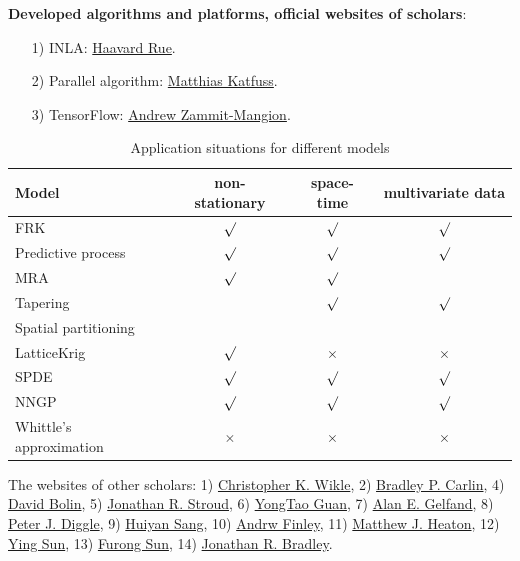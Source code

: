 \documentclass[
12pt, %
a4paper, %
oneside, %
headinclude,footinclude, %
BCOR5mm, %
]{scrartcl}
\begin{document}
\textbf{Developed algorithms and platforms, official websites of scholars}:
\begin{itemize}
  \item [1)] INLA: \href{https://cemse.kaust.edu.sa/bayescomp}{Haavard Rue}.
  \item [2)] Parallel algorithm: \href{https://sites.google.com/view/katzfuss/}{Matthias Katfuss}.
  \item [3)] TensorFlow: \href{https://niasra.uow.edu.au/cei/people/UOW202823.html}{Andrew Zammit-Mangion}.
\end{itemize}
\begin{table}[H]
	\caption{Application situations for different models}
\begin{tabular}{|l|c|c|c|}
\hline
{\bf Model} & {\bf non-stationary} & {\bf space-time} & {\bf multivariate data} \\
\hline
       FRK &  $\surd$    &   $\surd$         &     $\surd$       \\
\hline
Predictive process &   $\surd$     &    $\surd$   &  $\surd$          \\
\hline
       MRA &  $\surd$     &    $\surd$    &            \\
\hline
  Tapering &      &    $\surd$   &    $\surd$    \\
\hline
Spatial partitioning &            &            &            \\
\hline
LatticeKrig &   $\surd$     &   $\times$    &   $\times$    \\
\hline
      SPDE &   $\surd$    &    $\surd$   &    $\surd$  \\
\hline
      NNGP &   $\surd$    &    $\surd$    &   $\surd$         \\
\hline
Whittle’s approximation &   $\times$      &   $\times$    &    $\times$   \\
\hline
\end{tabular}
  \label{table:Scope}
\end{table}

The websites of other scholars: 1) \href{https://www.stat.missouri.edu/people/wikle}{Christopher K. Wikle}, 2)
\href{https://www.counterpointstat.com/bradleycarlin.html}{Bradley P. Carlin}, 4)
\href{https://cemse.kaust.edu.sa/stochproc}{David Bolin}, 5)
\href{https://gufaculty360.georgetown.edu/s/contact/00336000014SrlEAAS/jonathan-stroud}{Jonathan R. Stroud}, 6)
\href{https://www.bus.miami.edu/thought-leadership/faculty/management-science/guan.html}{YongTao Guan}, 7)
\href{http://www2.stat.duke.edu/~alan/}{Alan E. Gelfand}, 8)
\href{https://www.lancaster.ac.uk/staff/diggle/}{Peter J. Diggle}, 9)
\href{https://www.stat.tamu.edu/~huiyan/}{Huiyan  Sang}, 10)
\href{https://www.canr.msu.edu/people/andrew_o_finley}{Andrw Finley}, 11)
\href{https://mheaton.byu.edu/docs/research.html}{Matthew J. Heaton}, 12)
\href{https://www.kaust.edu.sa/en/study/faculty/ying-sun}{Ying Sun}, 13)
\href{https://scholar.google.com/citations?user=dbFZvbwAAAAJ&hl=en}{Furong Sun}, 14)
\href{https://sites.google.com/site/jonathanbradley28/}{Jonathan R. Bradley}.
\end{document}

